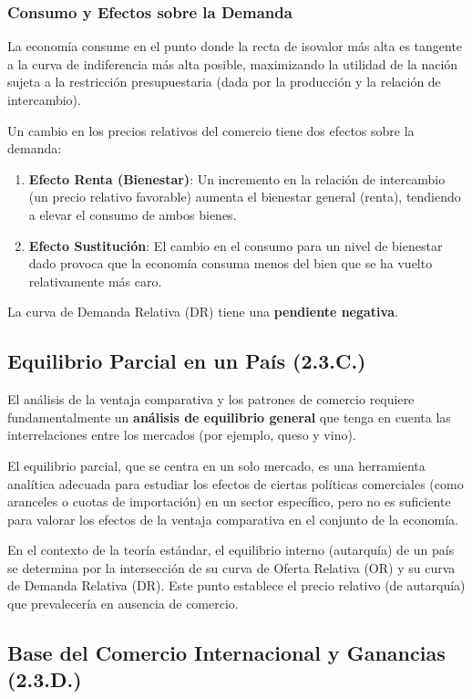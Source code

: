 \subsubsection{Consumo y Efectos sobre la Demanda}
La economía consume en el punto donde la recta de isovalor más alta es tangente a la curva de indiferencia más alta posible, maximizando la utilidad de la nación sujeta a la restricción presupuestaria (dada por la producción y la relación de intercambio).

Un cambio en los precios relativos del comercio tiene dos efectos sobre la demanda:
\begin{enumerate}
    \item \textbf{Efecto Renta (Bienestar)}: Un incremento en la relación de intercambio (un precio relativo favorable) aumenta el bienestar general (renta), tendiendo a elevar el consumo de ambos bienes.
    \item \textbf{Efecto Sustitución}: El cambio en el consumo para un nivel de bienestar dado provoca que la economía consuma menos del bien que se ha vuelto relativamente más caro.
\end{enumerate}
La curva de Demanda Relativa (DR) tiene una \textbf{pendiente negativa}.

\subsection{Equilibrio Parcial en un País (2.3.C.)}
El análisis de la ventaja comparativa y los patrones de comercio requiere fundamentalmente un \textbf{análisis de equilibrio general} que tenga en cuenta las interrelaciones entre los mercados (por ejemplo, queso y vino).

El equilibrio parcial, que se centra en un solo mercado, es una herramienta analítica adecuada para estudiar los efectos de ciertas políticas comerciales (como aranceles o cuotas de importación) en un sector específico, pero no es suficiente para valorar los efectos de la ventaja comparativa en el conjunto de la economía.

En el contexto de la teoría estándar, el equilibrio interno (autarquía) de un país se determina por la intersección de su curva de Oferta Relativa (OR) y su curva de Demanda Relativa (DR). Este punto establece el precio relativo (de autarquía) que prevalecería en ausencia de comercio.

\subsection{Base del Comercio Internacional y Ganancias (2.3.D.)}

